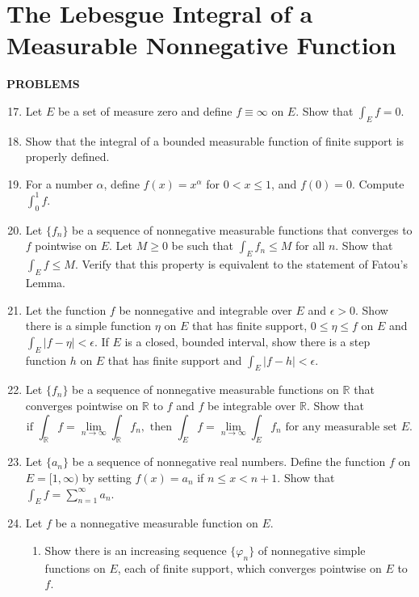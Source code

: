 \section{The Lebesgue Integral of a Measurable Nonnegative Function}

\begin{center}
	\textbf{PROBLEMS}
\end{center}
\begin{enumerate}
	\setcounter{enumi}{16}
    \item Let $E$ be a set of measure zero and define $f\equiv\infty$ on $E$. Show that $\int_Ef=0$.
    \item Show that the integral of a bounded measurable function of finite support is properly defined.
    \item For a number $\alpha$, define $f(x)=x^\alpha$ for $0<x\le1$, and $f(0)=0$. Compute $\int_0^1f$.
    \item Let $\{f_n\}$ be a sequence of nonnegative measurable functions that converges to $f$ pointwise on $E$.
    Let $M\ge0$ be such that $\int_Ef_n\le M$ for all $n$. Show that $\int_Ef\le M$. Verify that this property is equivalent to the statement of Fatou's Lemma.
    \item Let the function $f$ be nonnegative and integrable over $E$ and $\epsilon>0$. Show there is a simple function $\eta$ on $E$ that has finite support, $0\le\eta\le f$ on $E$ and $\int_E|f-\eta|<\epsilon$.
    If $E$ is a closed, bounded interval, show there is a step function $h$ on $E$ that has finite support and $\int_E|f-h|<\epsilon$.
    \item Let $\{f_n\}$ be a sequence of nonnegative measurable functions on $\mathbb{R}$ that converges pointwise on $\mathbb{R}$ to $f$ and $f$ be integrable over $\mathbb{R}$. Show that
    \[
        \text{if }\int_{\mathbb{R}}f=\lim_{n\to\infty}\int_{\mathbb{R}}f_n,\text{ then }\int_Ef=\lim_{n\to\infty}\int_Ef_n\text{ for any measurable set }E.    
    \]
    \item Let $\{a_n\}$ be a sequence of nonnegative real numbers. Define the function $f$ on $E=[1,\infty)$ by setting $f(x)=a_n$ if $n\le x<n+1$. Show that $\int_Ef=\sum_{n=1}^\infty a_n$.
    \item Let $f$ be a nonnegative measurable function on $E$.
    \begin{enumerate}[label=(\roman*),align=left]
        \item Show there is an increasing sequence $\{\varphi_n\}$ of nonnegative simple functions on $E$, each of finite support, which converges pointwise on $E$ to $f$.

\end{enumerate}
\end{enumerate}
